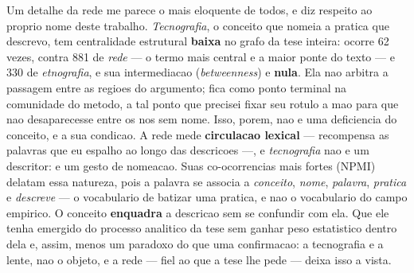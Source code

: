 Um detalhe da rede me parece o mais eloquente de todos, e diz respeito ao
proprio nome deste trabalho. \emph{Tecnografia}, o conceito que nomeia a
pratica que descrevo, tem centralidade estrutural \textbf{baixa} no grafo
da tese inteira: ocorre 62 vezes, contra 881 de \emph{rede} --- o termo
mais central e a maior ponte do texto --- e 330 de \emph{etnografia}, e
sua intermediacao (\emph{betweenness}) e \textbf{nula}. Ela nao arbitra a
passagem entre as regioes do argumento; fica como ponto terminal na
comunidade do metodo, a tal ponto que precisei fixar seu rotulo a mao
para que nao desaparecesse entre os nos sem nome. Isso, porem, nao e uma
deficiencia do conceito, e a sua condicao. A rede mede \textbf{circulacao
lexical} --- recompensa as palavras que eu espalho ao longo das
descricoes ---, e \emph{tecnografia} nao e um descritor: e um gesto de
nomeacao. Suas co-ocorrencias mais fortes (NPMI) delatam essa natureza,
pois a palavra se associa a \emph{conceito}, \emph{nome}, \emph{palavra},
\emph{pratica} e \emph{descreve} --- o vocabulario de batizar uma
pratica, e nao o vocabulario do campo empirico. O conceito
\textbf{enquadra} a descricao sem se confundir com ela. Que ele tenha
emergido do processo analitico da tese sem ganhar peso estatistico
dentro dela e, assim, menos um paradoxo do que uma confirmacao: a
tecnografia e a lente, nao o objeto, e a rede --- fiel ao que a tese lhe
pede --- deixa isso a vista.
